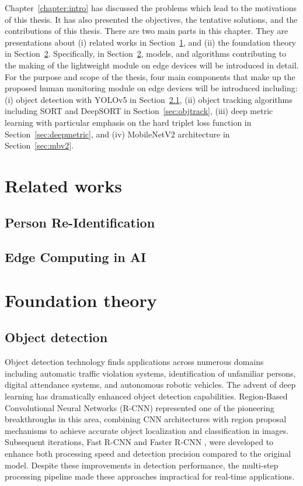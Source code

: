 \documentclass[../main.tex]{subfiles}
\begin{document}
Chapter~\ref{chapter:intro} has discussed the problems which lead to the motivations of this thesis. It has also presented the objectives, the tentative solutions, and the contributions of this thesis. There are two main parts in this chapter. They are presentations about (i) related works in Section~\ref{sec:related}, and (ii) the foundation theory in Section~\ref{sec:foundtheo}. Specifically, in Section~\ref{sec:foundtheo}, models, and algorithms contributing to the making of the lightweight module on edge devices will be introduced in detail. For the purpose and scope of the thesis, four main components that make up the proposed human monitoring module on edge devices will be introduced including: (i) object detection with YOLOv5 in Section~\ref{sec:objdect}, (ii) object tracking algorithms including SORT and DeepSORT in Section~\ref{sec:objtrack}, (iii) deep metric learning with particular emphasis on the hard triplet loss function in Section~\ref{sec:deepmetric}, and (iv) MobileNetV2 architecture in Section~\ref{sec:mbv2}.

\section{Related works}
\label{sec:related}
\subsection{Person Re-Identification}


\label{sec:reidsystem}
\subsection{Edge Computing in AI}


\section{Foundation theory}
\label{sec:foundtheo}
\subsection{Object detection}
\label{sec:objdect}

Object detection technology finds applications across numerous domains including automatic traffic violation systems, identification of unfamiliar persons, digital attendance systems, and autonomous robotic vehicles. The advent of deep learning has dramatically enhanced object detection capabilities. Region-Based Convolutional Neural Networks (R-CNN) \cite{girshick2014richfeaturehierarchiesaccurate} represented one of the pioneering breakthroughs in this area, combining CNN architectures \cite{oshea2015introductionconvolutionalneuralnetworks} with region proposal mechanisms to achieve accurate object localization and classification in images. Subsequent iterations, Fast R-CNN \cite{girshick2015fastrcnn} and Faster R-CNN \cite{ren2016fasterrcnnrealtimeobject}, were developed to enhance both processing speed and detection precision compared to the original model. Despite these improvements in detection performance, the multi-step processing pipeline made these approaches impractical for real-time applications.
\end{document}

